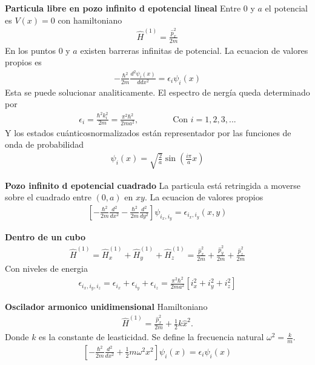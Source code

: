 \documentclass{article}
\begin{document}
\textbf{Particula libre en pozo infinito d epotencial lineal }  
Entre 0 y $ a  $ el potencial es $ V(x) = 0  $ con hamiltoniano
\begin{gather*}
  \hat H ^ {(1) } = \frac{\hat p ^2 _x }{2m } 
\end{gather*}
En los puntos 0 y $ a  $ existen barreras infinitas de potencial. La ecuacion de valores propios es 
\begin{gather*}
  - \frac{\hbar ^2 }{2m } \frac{d ^2 \psi_i(x)  }{d dx^2 } = \epsilon_i \psi_i(x) 
\end{gather*}
Esta se puede solucionar analiticamente. El espectro de nergía queda determinado por 
\begin{gather*}
  \epsilon_i = \frac{\hbar ^2 k_i^2 }{2m } = \frac{\pi^2 \hbar ^2 }{2ma^2 }, \qquad \qquad \text{Con } i = 1,2,3,... 
\end{gather*}
Y los estados cuánticosnormalizados están representador por las funciones de onda de probabilidad 
\begin{gather*}
  \psi_i (x) = \sqrt{\frac{2 }{ a }} \sin{\left(\frac{i \pi }{a } x \right)} 
\end{gather*}

\hfill 

\hfill 

\textbf{Pozo infinito d epotencial cuadrado }
La particula está retringida a moverse sobre el cuadrado entre $ (0,a)  $ en $ xy  $. La ecuacion de valores propios 
\begin{gather*}
  \left[- \frac{\hbar ^2 }{2m } \frac{d ^2  }{d x^2 } - \frac{\hbar ^2 }{2m } \frac{d ^2  }{d y^2 }\right] \psi _{i_x,i_y } = \epsilon _{i_x,i_y }(x,y)   
\end{gather*}

\hfill 

\hfill 

\textbf{Dentro de un cubo }
\begin{gather*}
  \hat H ^ {(1) } = \hat H_x ^ {(1)} +\hat H_y ^ {(1)}+\hat H_z ^ {(1)} = \frac{\hat p_x^2 }{2m } + \frac{\hat p_y^2 }{2m } + \frac{\hat p_z^2 }{2m }
\end{gather*}
Con niveles de energia 
\begin{gather*}
  \epsilon _{i_x,i_y,i_z }  = \epsilon _{i_x } + \epsilon _{i_y }  + \epsilon _{i_z }  = \frac{\pi^2 \hbar ^2 }{2ma^2 }[i_x^2+i_y^2+i_z^2]
\end{gather*}

\hfill 

\hfill 

\textbf{Oscilador armonico unidimensional } 
Hamiltoniano 
\begin{gather*}
  \hat H ^ {(1) } = \frac{\hat p_x^2 }{2m } + \frac{1}{2} k \hat x^2  .
\end{gather*}
Donde $ k  $ es la constante de leasticidad. Se define la frecuencia natural $ \omega^2 = \frac{k}{m } $. 
\begin{gather*}
  \left[- \frac{\hbar ^2}{2m } \frac{d ^2  }{d x^2 } + \frac{1}{2}m \omega^2 x^2 \right]\psi_i (x) = \epsilon_i \psi_i (x)  
\end{gather*}
\end{document}
